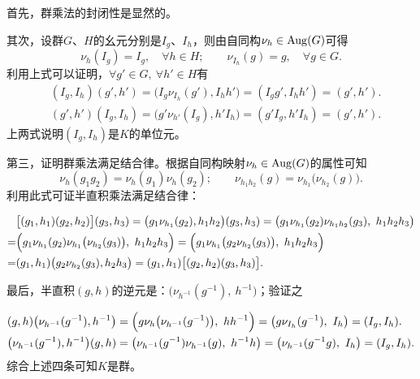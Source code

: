 首先，群乘法的封闭性是显然的。

其次，设群$G$、$H$的幺元分别是$I_g$、$I_h$，则由自同构$\nu_h\in {\rm Aug}(G)$可得
\begin{equation}
    \nu_h (I_g)   =I_g, \quad  \forall h\in H ; \qquad
    \nu_{I_h} (g) = g,  \quad  \forall g\in G .
\end{equation}
利用上式可以证明，$\forall g'\in G,\ \forall h'\in H$有
\begin{align}
    &( I_g, I_h ) (g', h') = \bigl( I_g \nu_{I_h}(g'), I_h h' \bigr)
    = ( I_g g', I_h h') =( g' ,h'). \\
    & ( g' ,h' )( I_g, I_h ) = \bigl(g'  \nu_{h'}( I_g), h' I_h \bigr)
    =(g' I_g,  h' I_h) =( g', h').
\end{align}
上两式说明$( I_g, I_h) $是$K$的{\kaishu 单位元}。

第三，证明群乘法满足结合律。根据自同构映射$\nu_h\in {\rm Aug}(G)$的属性可知
\begin{equation}
    \nu_{h} (g_1 g_2) = \nu_{h}(g_1) \nu_{h}(g_2); \qquad
    \nu_{h_1 h_2} (g) = \nu_{h_1}\bigl(\nu_{h_2}(g)\bigr) .
\end{equation}
利用此式可证半直积乘法满足结合律：

\begin{align*}
    &\bigl[(g_1, h_1)(g_2, h_2)\bigr] (g_3 ,h_3)
    =\bigl(g_1 \nu_{h_1}(g_2), h_1 h_2\bigr) (g_3, h_3)
    =\bigl( g_1 \nu_{h_1}(g_2) \nu_{h_1 h_2}(g_3) ,\  h_1 h_2 h_3 \bigr) \\
    =&\Bigl( g_1 \nu_{h_1}(g_2) \nu_{h_1}\bigl(\nu_{h_2} (g_3)\bigr) ,\  h_1 h_2 h_3 \Bigr)
    =\Bigl( g_1 \nu_{h_1} \bigl(g_2 \nu_{h_2} (g_3)\bigr)   ,\ h_1 h_2 h_3 \Bigr)\\
    =&( g_1, h_1) \bigl( g_2 \nu_{h_2} (g_3), h_2 h_3 \bigr)
    =( g_1, h_1) \bigl[( g_2, h_2) (g_3, h_3)\bigr].
\end{align*}


最后，半直积$(g,h)$的逆元是：$\bigl(\nu_{h^{-1}}(g^{-1}),\ h^{-1}\bigr)$；验证之

\begin{align*}
    &(g,h) \bigl(\nu_{h^{-1}}(g^{-1}), h^{-1}\bigr) 
    = \Bigl(g \nu_{h}\bigl(\nu_{h^{-1}}(g^{-1})\bigr) , \ h h^{-1}\Bigr)
    =\bigl(g \nu_{I_h}(g^{-1}), \ I_h \bigr) = (I_g, I_h) . \\
    &\bigl(\nu_{h^{-1}}(g^{-1}), h^{-1}\bigr)  (g,h)
    =\bigl(\nu_{h^{-1}}(g^{-1}) \nu_{h^{-1}}(g), \ h^{-1} h\bigr) 
    =\bigl(\nu_{h^{-1}}(g^{-1} g) ,\ I_h\bigr) 
    =(I_g , I_h ) .
\end{align*}
综合上述四条可知$K$是群。

